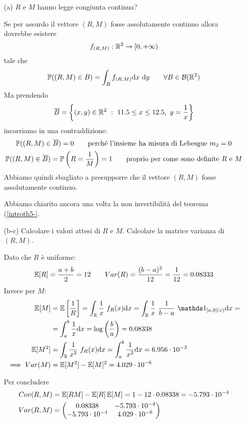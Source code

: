 \begin{enumerate}
\item [(a)] $R$ e $M$ hanno legge congiunta continua?

Se per assurdo il vettore $(R,M)$ fosse assolutamente continuo allora dovrebbe esistere
\[
f_{(R,M)}:\mathbb{R}^2\to[0,+\infty)
\]
tale che
\[
\mathbb{P}((R,M)\in B)=\int_B f_{(R,M)}\mathrm{d} x\ \mathrm{d} y\qquad\forall B\in\mathcal{B}(\mathbb{R}^2)
\]
Ma prendendo
\[
\overline{B}=\left\{(x,y)\in\mathbb{R}^2\ :\ 11.5\leq x\leq 12.5,\ y=\frac{1}{x}  \right\}
\]
incorriamo in una contraddizione:
\begin{gather*} 
\mathbb{P}((R,M)\in \overline{B})=0\qquad\text{perché l'insieme ha misura di Lebesgue }m_2=0 \\
\mathbb{P}((R,M)\in \overline{B})=\mathbb{P}\left(R=\frac{1}{M}\right)=1\qquad\text{proprio per come sono definite }R\text{ e }M
\end{gather*}
Abbiamo quindi sbagliato a presupporre che il vettore $(R,M)$ fosse assolutamente continuo.

\begin{oss} Abbiamo chiarito ancora una volta la non invertibilità del teorema (\ref{introth5-}. \end{oss}

\item [(b-c)] Calcolare i valori attesi di $R$ e $M$. Calcolare la matrice varianza di $(R,M)$.

Dato che $R$ è uniforme:
\[
\mathbb{E}[R]=\frac{a+b}{2}=12 \qquad Var(R)=\frac{(b-a)^2}{12}=\frac{1}{12}=0.08333
\]
Invece per $M$:
\begin{gather*}
\begin{aligned}
\EE[M]&=\EE\left[ \frac{1}{R} \right]=\int_\RR \frac{1}{x}\ f_R(x)\dx=\int_\RR \frac{1}{x}\ \frac{1}{b-a}\ \Ind_{[a,b](x)}\dx=\\
&=\int_{a}^{b} \frac{1}{x}\dx=\log\left( \frac{b}{a} \right)=0.08338\\
\EE[M^2]&=\int_\RR \frac{1}{x^2}\ f_R(x)\dx=\int_{a}^{b} \frac{1}{x^2}\dx=6.956\cdot 10^{-3}\\
\implies Var(M)&=\EE[M^2]-\EE[M]^2=4.029\cdot 10^{-6}
\end{aligned}
\end{gather*}

Per concludere
\begin{gather*}
\begin{aligned}
Cov(R,M)&=\mathbb{E}[RM]-\mathbb{E}[R]\,\mathbb{E}[M]=1-12\cdot 0.08338 = -5.793\cdot 10^{-4}\\
Var(R,M)&=
\begin{pmatrix}
0.08338 & -5.793\cdot 10^{-4} \\
-5.793\cdot 10^{-4} & 4.029\cdot 10^{-6} \\
\end{pmatrix}
\end{aligned}
\end{gather*}


\end{enumerate}
